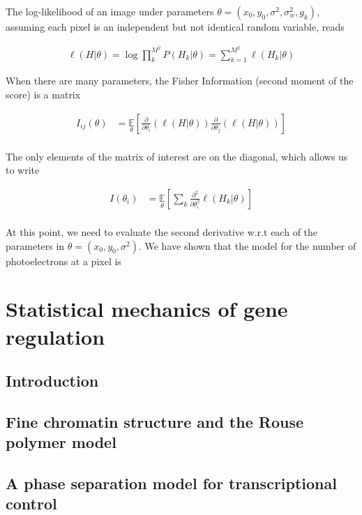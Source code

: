 \documentclass{ucetd}
\begin{document}
\vspace{0.2in}
The log-likelihood of an image under parameters $\theta = (x_{0},y_{0},\sigma^{2},\sigma_{w}^{2},g_{k})$, assuming each pixel is an independent but not identical random variable, reads

\begin{align*}
\ell(H|\theta) = \log\prod_{k}^{M^{2}} P(H_{k}|\theta) = \sum_{k=1}^{M^{2}} \ell (H_{k}|\theta)
\end{align*}


When there are many parameters, the Fisher Information (second moment of the score) is a matrix

\begin{align*}
I_{ij}(\theta) &= \underset{\theta}{\mathbb{E}}\left[\frac{\partial}{\partial\theta_{i}} \left(\ell(H|\theta)\right)\frac{\partial}{\partial\theta_{j}} \left(\ell(H|\theta)\right)\right]\\
\end{align*}

The only elements of the matrix of interest are on the diagonal, which allows us to write

\begin{align*}
I(\theta_{i}) &= \underset{\theta}{\mathbb{E}}\left[\sum_{k}\frac{\partial^{2}}{\partial\theta_{i}^{2}}  \ell (H_{k}|\theta)\right]\\
\end{align*}

At this point, we need to evaluate the second derivative w.r.t each of the parameters in $\theta = (x_{0},y_{0},\sigma^{2})$. We have shown that the model for the number of photoelectrons at a pixel is


\chapter{Statistical mechanics of gene regulation}

\section{Introduction}

\section{Fine chromatin structure and the Rouse polymer model}

\section{A phase separation model for transcriptional control}
\end{document}
